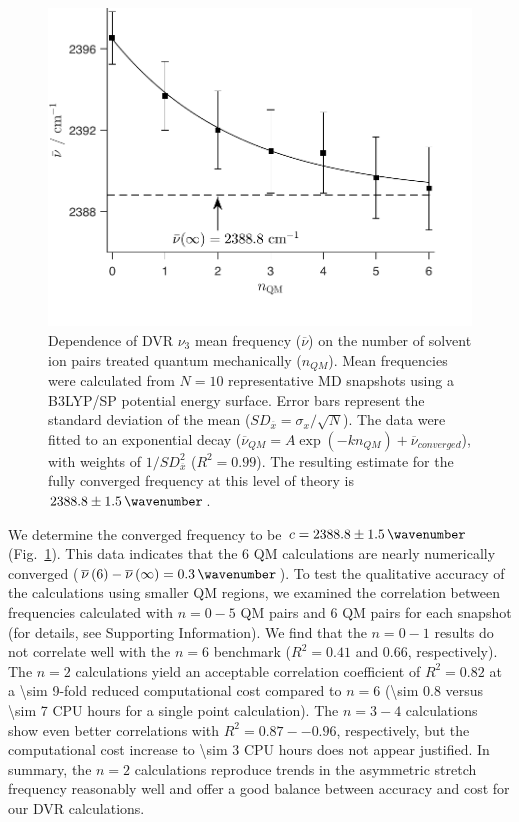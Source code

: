 \documentclass[%
  class = book,%
  crop = false,%
  float = true,%
  multi = true,%
  preview = false,%
]{standalone}
\begin{document}
\begin{figure}
  \centering
  \includegraphics{Fig5.pdf}
  \caption[DVR convergence with respect to number of QM ion pairs]{Dependence of DVR \(\nu_{3}\) mean frequency (\(\overline{\nu}\)) on the number of solvent ion pairs treated quantum mechanically (\(n_{QM}\)). Mean frequencies were calculated from \(N = 10\) representative MD snapshots using a B3LYP/SP potential energy surface. Error bars represent the standard deviation of the mean (\(SD_{\overline{x}} = \sigma_{x}/\sqrt{N}\)). The data were fitted to an exponential decay (\({\overline{\nu}}_{QM} = A\exp\left( - kn_{QM} \right) + {\overline{\nu}}_{converged}\)), with weights of \(1/SD_{\overline{x}}^{2}\) (\(R^2 = 0.99\)). The resulting estimate for the fully converged frequency at this level of theory is \(2388.8 \pm \SI{1.5}{\wavenumber}\).}
  \label{paper_02:fig:5}
\end{figure}

We determine the converged frequency to be \(c = 2388.8 \pm \SI{1.5}{\wavenumber}\) (Fig.~\ref{paper_02:fig:5}). This data indicates that the \num{6} QM calculations are nearly numerically converged (\(\overline{\nu}\left( 6 \right) - \overline{\nu}\left( \infty \right) = \SI{0.3}{\wavenumber}\)). To test the qualitative accuracy of the calculations using smaller QM regions, we examined the correlation between frequencies calculated with \(n = 0-5\) QM pairs and \num{6} QM pairs for each snapshot (for details, see Supporting Information). We find that the \(n = 0-1\) results do not correlate well with the \(n = 6\) benchmark (\(R^{2} = 0.41\) and \num{0.66}, respectively). The \(n = 2\) calculations yield an acceptable correlation coefficient of \(R^2 = 0.82\) at a \num{\sim 9}-fold reduced computational cost compared to \(n = 6\) (\num{\sim 0.8} versus \num{\sim 7} CPU hours for a single point calculation). The \(n = 3-4\) calculations show even better correlations with \(R^2 = 0.87 -- 0.96\), respectively, but the computational cost increase to \num{\sim 3} CPU hours does not appear justified. In summary, the \(n = 2\) calculations reproduce trends in the  asymmetric stretch frequency reasonably well and offer a good balance between accuracy and cost for our DVR calculations.
\end{document}
